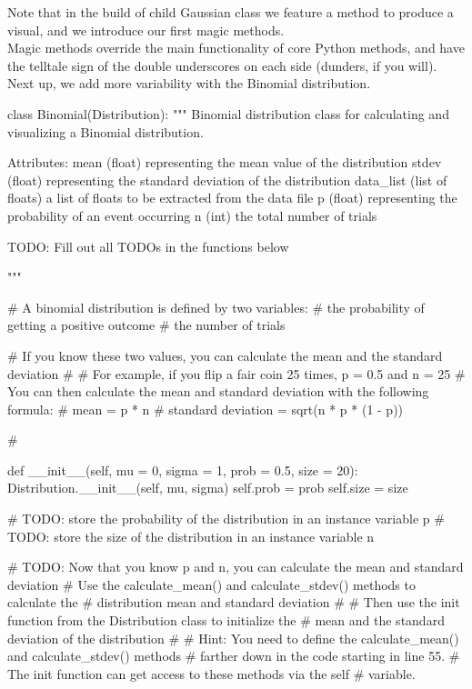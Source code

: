 Note that in the build of child Gaussian class we feature a method to produce a visual, and we introduce our first magic methods.
\\

Magic methods override the main functionality of core Python methods, and have the telltale sign of the double underscores on each side (dunders, if you will).
\\

Next up, we add more variability with the Binomial distribution.

\begin{python}
	class Binomial(Distribution):
		""" Binomial distribution class for calculating and 
		visualizing a Binomial distribution.
		
		Attributes:
		mean (float) representing the mean value of the distribution
		stdev (float) representing the standard deviation of the distribution
		data_list (list of floats) a list of floats to be extracted from the data 	file
		p (float) representing the probability of an event occurring
		n (int) the total number of trials
		
		
		TODO: Fill out all TODOs in the functions below
		
		"""
		
		#       A binomial distribution is defined by two variables: 
		#           the probability of getting a positive outcome
		#           the number of trials
		
		#       If you know these two values, you can calculate the mean and the 	standard deviation
		#       
		#       For example, if you flip a fair coin 25 times, p = 0.5 and n = 25
		#       You can then calculate the mean and standard deviation with the 	following formula:
		#           mean = p * n
		#           standard deviation = sqrt(n * p * (1 - p))
		
		#       
		
		def __init__(self, mu = 0, sigma = 1, prob = 0.5, size = 20):
			Distribution.__init__(self, mu, sigma)
			self.prob = prob
			self.size = size
		
		# TODO: store the probability of the distribution in an instance variable p
		# TODO: store the size of the distribution in an instance variable n
		
		# TODO: Now that you know p and n, you can calculate the mean and standard 	deviation
		#       Use the calculate_mean() and calculate_stdev() methods to calculate 	the
		#       distribution mean and standard deviation
		#
		#       Then use the init function from the Distribution class to 	initialize the
		#       mean and the standard deviation of the distribution
		#
		#       Hint: You need to define the calculate_mean() and calculate_stdev() 	methods
		#               farther down in the code starting in line 55. 
		#               The init function can get access to these methods via the 	self
		#               variable.             
		

\end{python}
